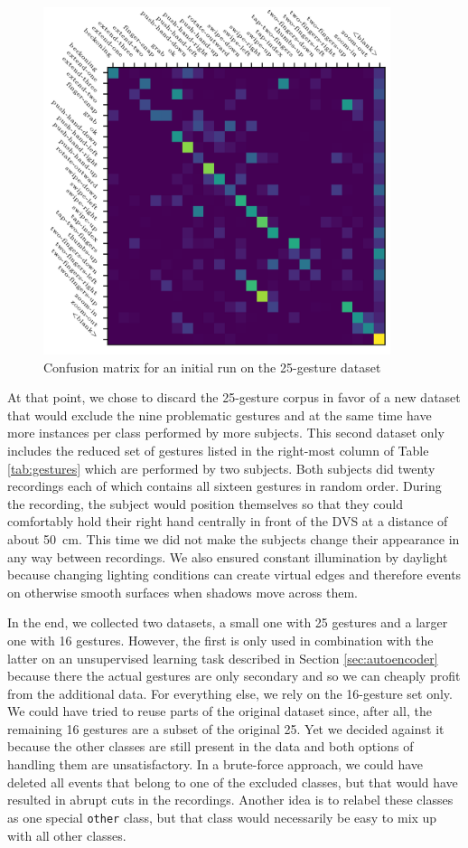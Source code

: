\begin{figure}[h]
  \centering
  \includegraphics[width=4in]{figures/dataset/confusion-matrix}
  \caption{Confusion matrix for an initial run on the 25-gesture dataset}
  \label{fig:confusion-25}
\end{figure}

At that point, we chose to discard the 25-gesture corpus in favor of a new
dataset that would exclude the nine problematic gestures and at the same time
have more instances per class performed by more subjects. This second dataset
only includes the reduced set of gestures listed in the right-most column of
Table \ref{tab:gestures} which are performed by two subjects. Both subjects did
twenty recordings each of which contains all sixteen gestures in random order.
During the recording, the subject would position themselves so that they could
comfortably hold their right hand centrally in front of the DVS at a distance of
about \SI{50}{\centi\meter}. This time we did not make the subjects change their
appearance in any way between recordings. We also ensured constant illumination
by daylight because changing lighting conditions can create virtual edges and
therefore events on otherwise smooth surfaces when shadows move across them.

In the end, we collected two datasets, a small one with 25 gestures and a larger
one with 16 gestures. However, the first is only used in combination with the
latter on an unsupervised learning task described in Section
\ref{sec:autoencoder} because there the actual gestures are only secondary and
so we can cheaply profit from the additional data. For everything else, we rely
on the 16-gesture set only. We could have tried to reuse parts of the original
dataset since, after all, the remaining 16 gestures are a subset of the original
25. Yet we decided against it because the other classes are still present in the
data and both options of handling them are unsatisfactory. In a brute-force
approach, we could have deleted all events that belong to one of the excluded
classes, but that would have resulted in abrupt cuts in the recordings. Another
idea is to relabel these classes as one special \texttt{other} class, but that
class would necessarily be easy to mix up with all other classes.

